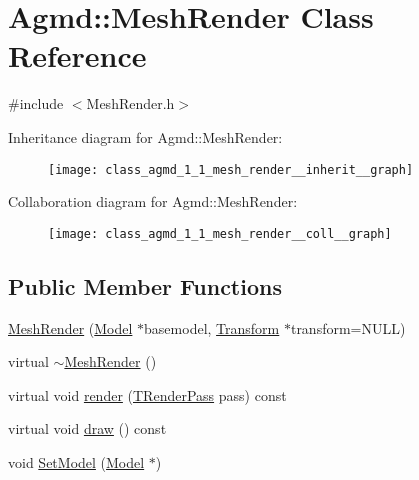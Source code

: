 \hypertarget{class_agmd_1_1_mesh_render}{\section{Agmd\+:\+:Mesh\+Render Class Reference}
\label{class_agmd_1_1_mesh_render}
}


{\ttfamily \#include $<$Mesh\+Render.\+h$>$}



Inheritance diagram for Agmd\+:\+:Mesh\+Render\+:\nopagebreak
\begin{figure}[H]
\begin{center}
\leavevmode
\texttt{[image: class\_agmd\_1\_1\_mesh\_render\_\_inherit\_\_graph]}
\end{center}
\end{figure}


Collaboration diagram for Agmd\+:\+:Mesh\+Render\+:\nopagebreak
\begin{figure}[H]
\begin{center}
\leavevmode
\texttt{[image: class\_agmd\_1\_1\_mesh\_render\_\_coll\_\_graph]}
\end{center}
\end{figure}
\subsection*{Public Member Functions}
\begin{DoxyCompactItemize}
\item 
\hyperlink{class_agmd_1_1_mesh_render_a614e53595493d9062a0e9a8532ce2601}{Mesh\+Render} (\hyperlink{class_agmd_1_1_model}{Model} $\ast$basemodel, \hyperlink{class_agmd_maths_1_1_transform}{Transform} $\ast$transform=N\+U\+L\+L)
\item 
virtual \hyperlink{class_agmd_1_1_mesh_render_ab8346cd65314aac309ca3428a4b46b12}{$\sim$\+Mesh\+Render} ()
\item 
virtual void \hyperlink{class_agmd_1_1_mesh_render_a3052b6e1e2b1d90ab2a77f24444c6273}{render} (\hyperlink{namespace_agmd_a893087981df53d0bf39466e9039aeb73}{T\+Render\+Pass} pass) const 
\item 
virtual void \hyperlink{class_agmd_1_1_mesh_render_a4d0e321f6498e233ee0912032cda8c45}{draw} () const 
\item 
void \hyperlink{class_agmd_1_1_mesh_render_a27af8050f0e60744b324e6ba1f188271}{Set\+Model} (\hyperlink{class_agmd_1_1_model}{Model} $\ast$)
\end{DoxyCompactItemize}
